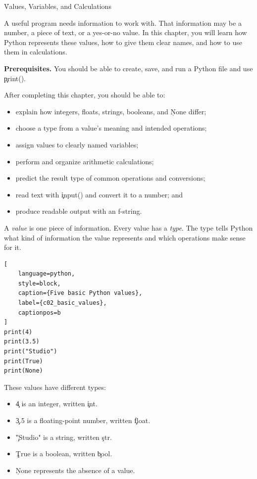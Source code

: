 
\h{Values, Variables, and Calculations}
\label{ch:02}

A useful program needs information to work with. That information may be a
number, a piece of text, or a yes-or-no value. In this chapter, you will learn
how Python represents these values, how to give them clear names, and how to
use them in calculations.

\begin{NoteBox}
\textbf{Prerequisites.} You should be able to create, save, and run a Python
file and use \c{print()}.
\end{NoteBox}

\begin{tcolorbox}[title=Learning outcomes,colframe=orange,colback=white,arc=2mm]
After completing this chapter, you should be able to:
\begin{itemize}
    \item explain how integers, floats, strings, booleans, and \c{None} differ;
    \item choose a type from a value's meaning and intended operations;
    \item assign values to clearly named variables;
    \item perform and organize arithmetic calculations;
    \item predict the result type of common operations and conversions;
    \item read text with \c{input()} and convert it to a number; and
    \item produce readable output with an f-string.
\end{itemize}
\end{tcolorbox}


A \emph{value} is one piece of information. Every value has a \emph{type}. The
type tells Python what kind of information the value represents and which
operations make sense for it.

\begin{lstlisting}[
    language=python,
    style=block,
    caption={Five basic Python values},
    label={c02_basic_values},
    captionpos=b
]
print(4)
print(3.5)
print("Studio")
print(True)
print(None)
\end{lstlisting}

These values have different types:
\begin{itemize}
    \item \c{4} is an integer, written \c{int}.
    \item \c{3.5} is a floating-point number, written \c{float}.
    \item \c{"Studio"} is a string, written \c{str}.
    \item \c{True} is a boolean, written \c{bool}.
    \item \c{None} represents the absence of a value.
\end{itemize}

